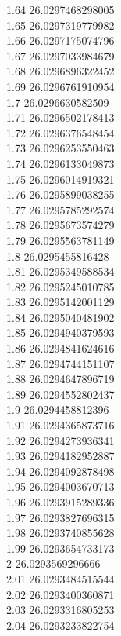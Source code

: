 {1.64	26.0297468298005\\
1.65	26.0297319779982\\
1.66	26.0297175074796\\
1.67	26.0297033984679\\
1.68	26.0296896322452\\
1.69	26.0296761910954\\
1.7	26.0296630582509\\
1.71	26.0296502178413\\
1.72	26.0296376548454\\
1.73	26.0296253550463\\
1.74	26.0296133049873\\
1.75	26.0296014919321\\
1.76	26.0295899038255\\
1.77	26.0295785292574\\
1.78	26.0295673574279\\
1.79	26.0295563781149\\
1.8	26.0295455816428\\
1.81	26.0295349588534\\
1.82	26.0295245010785\\
1.83	26.0295142001129\\
1.84	26.0295040481902\\
1.85	26.0294940379593\\
1.86	26.0294841624616\\
1.87	26.0294744151107\\
1.88	26.0294647896719\\
1.89	26.0294552802437\\
1.9	26.0294458812396\\
1.91	26.0294365873716\\
1.92	26.0294273936341\\
1.93	26.0294182952887\\
1.94	26.0294092878498\\
1.95	26.0294003670713\\
1.96	26.0293915289336\\
1.97	26.0293827696315\\
1.98	26.0293740855628\\
1.99	26.0293654733173\\
2	26.0293569296666\\
2.01	26.0293484515544\\
2.02	26.0293400360871\\
2.03	26.0293316805253\\
2.04	26.0293233822754\\
}
